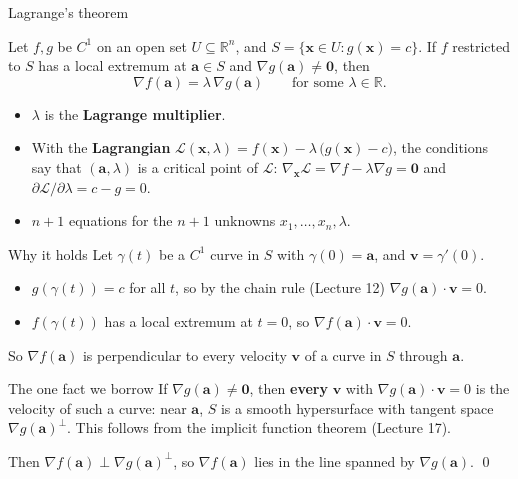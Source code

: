 \documentclass[10pt]{wosm-slides}
\newcommand{\R}{\mathbb{R}}
\newcommand{\vx}{\mathbf{x}}
\newcommand{\va}{\mathbf{a}}
\DeclareRobustCommand{\vv}{\mathbf{v}}
\newcommand{\Lag}{\mathcal{L}}
\begin{document}
\begin{frame}{Lagrange's theorem}
  \begin{theorem}[Lagrange]
    Let $f, g$ be $C^1$ on an open set $U \subseteq \R^n$, and $S = \{\vx \in U : g(\vx) = c\}$. If
    $f$ restricted to $S$ has a local extremum at $\va \in S$ and $\nabla g(\va) \ne \mathbf 0$, then
    \[ \nabla f(\va) = \lambda\, \nabla g(\va) \qquad \text{for some } \lambda \in \R . \]
  \end{theorem}
  \pause
  \begin{itemize}
    \item $\lambda$ is the \textbf{Lagrange multiplier}.
    \item With the \textbf{Lagrangian} $\Lag(\vx, \lambda) = f(\vx) - \lambda\,\bigl(g(\vx) - c\bigr)$, the
      conditions say that $(\va, \lambda)$ is a critical point of $\Lag$:
      $\nabla_{\vx}\Lag = \nabla f - \lambda\nabla g = \mathbf 0$ and
      $\partial\Lag/\partial\lambda = c - g = 0$.
    \item $n + 1$ equations for the $n + 1$ unknowns $x_1, \dots, x_n, \lambda$.
  \end{itemize}
\end{frame}

\begin{frame}{Why it holds}
  Let $\gamma(t)$ be a $C^1$ curve in $S$ with $\gamma(0) = \va$, and $\vv = \gamma'(0)$.
  \pause
  \begin{itemize}
    \item $g(\gamma(t)) = c$ for all $t$, so by the chain rule (Lecture 12)
      $\nabla g(\va) \cdot \vv = 0$.
    \item $f(\gamma(t))$ has a local extremum at $t = 0$, so $\nabla f(\va) \cdot \vv = 0$.
  \end{itemize}
  \pause
  So $\nabla f(\va)$ is perpendicular to every velocity $\vv$ of a curve in $S$ through $\va$.
  \pause
  \begin{block}{The one fact we borrow}
    If $\nabla g(\va) \ne \mathbf 0$, then \textbf{every} $\vv$ with $\nabla g(\va)\cdot\vv = 0$ is the
    velocity of such a curve: near $\va$, $S$ is a smooth hypersurface with tangent space
    $\nabla g(\va)^\perp$. This follows from the implicit function theorem (Lecture 17).
  \end{block}
  \pause
  Then $\nabla f(\va) \perp \nabla g(\va)^\perp$, so $\nabla f(\va)$ lies in the line spanned by
  $\nabla g(\va)$. \qed
\end{frame}
\end{document}
